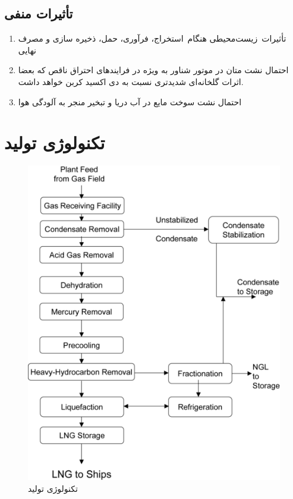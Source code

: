 \subsection{تأثیرات منفی}
\begin{enumerate}
	\item 	تأثیرات زیست‌محیطی هنگام استخراج، فرآوری، حمل، ذخیره سازی و مصرف نهایی 
	\item احتمال نشت متان  در موتور شناور به ویژه در فرایندهای احتراق ناقص که بعضا اثرات گلخانه‌ای شدیدتری نسبت به دی اکسید کربن خواهد داشت.
	\item احتمال نشت سوخت مایع در آب دریا و تبخیر منجر به آلودگی هوا

\end{enumerate}

\section{تکنولوژی تولید}
\begin{figure}[!h]
	\centering
	\includegraphics[width=15cm]{Figures/LNG/technology.png}
	\caption{تکنولوژی تولید}\label{technology}
\end{figure}
